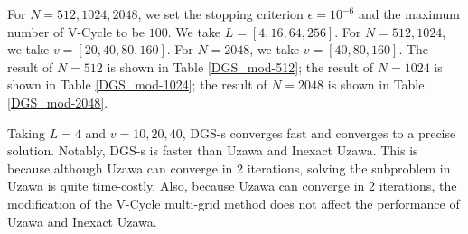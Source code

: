 \documentclass[english]{pkupaper}
\begin{document}
For $N=512, 1024, 2048$, we set the stopping criterion $\epsilon =10^{-6}$ and the maximum number of V-Cycle to be $100$. We take $L=[4, 16, 64, 256]$. For $N = 512, 1024$, we take $v = [20, 40, 80, 160]$.  For $N=2048$, we take $v = [40, 80, 160]$. The result of $N=512$ is shown in Table \ref{DGS_mod-512}; the result of $N=1024$ is shown in Table \ref{DGS_mod-1024}; the result of $N=2048$ is shown in Table \ref{DGS_mod-2048}.





Taking $L=4$ and $v=10,20,40$, DGS-s converges fast and converges to a precise solution. Notably, DGS-s is faster than Uzawa and Inexact Uzawa. This is because although Uzawa can converge in 2 iterations, solving the subproblem in Uzawa is quite time-costly. Also, because Uzawa can converge in 2 iterations, the modification of the V-Cycle multi-grid method does not affect the performance of Uzawa and Inexact Uzawa.

\printbibliography
\end{document}
